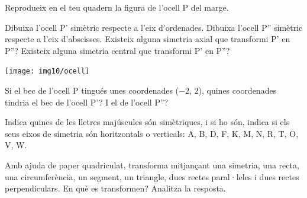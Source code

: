 \begin{mylist}

\vspace{-2.5cm}
\exer \begin{minipage}[t]{0.6\textwidth}
	Reprodueix en el teu quadern la figura de l'ocell P del marge. 
	
	\begin{tasks}
		\task  Dibuixa l'ocell P' simètric respecte a l'eix d'ordenades.
		\task  Dibuixa l'ocell P'' simètric respecte a l'eix d'abscisses. 
		\task  Existeix alguna simetria axial que transformi P' en P''? Existeix alguna simetria central que transformi P' en P''?
	\end{tasks}
\end{minipage}
\begin{minipage}{0.4\textwidth}
	\centering
	\vspace{2.5cm}
	\texttt{[image: img10/ocell]}
\end{minipage}

\begin{tasks}[resume=true]
	\task  Si el bec de l'ocell P tingués unes coordenades ($-2$, $2$), quines coordenades tindria el bec de l'ocell P'? I el de l'ocell P''?
\end{tasks}
 
 
\exer \mental Indica quines de les lletres majúscules són simètriques, i si ho són, indica si els seus eixos de simetria són horitzontals o verticals: A, B, D, F, K, M, N, R, T, O, V, W.


\exer  Amb ajuda de paper quadriculat, transforma mitjançant una simetria, una recta, una circumferència, un segment, un triangle, dues rectes paral·leles i dues rectes perpendiculars. En què es transformen? Analitza la resposta.


\end{mylist}
